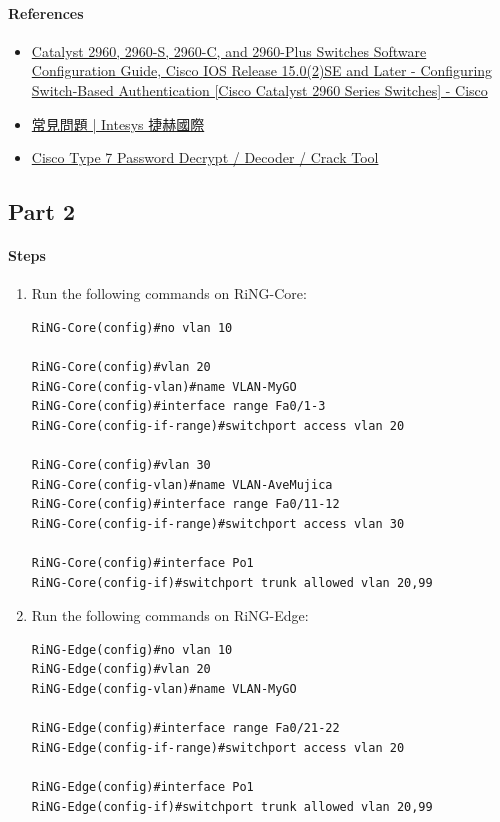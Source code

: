 \documentclass[12pt, a4paper]{article}
\begin{document}
  \paragraph{References}
  \begin{itemize}
    \item \href{https://www.cisco.com/c/en/us/td/docs/switches/lan/catalyst2960/software/release/15-0_2_se/configuration/guide/scg2960/swauthen.html}{Catalyst 2960, 2960-S, 2960-C, and 2960-Plus Switches Software Configuration Guide, Cisco IOS Release 15.0(2)SE and Later - Configuring Switch-Based Authentication [Cisco Catalyst 2960 Series Switches] - Cisco}
    \item \href{https://www.intesys.com.tw/edcontent_d.php?lang=tw&tb=10&cid=18&id=105}{常見問題 | Intesys 捷赫國際}
    \item \href{https://www.firewall.cx/cisco/cisco-routers/cisco-type7-password-crack.html}{Cisco Type 7 Password Decrypt / Decoder / Crack Tool}
  \end{itemize}

  \subsection*{Part 2}
  \paragraph{Steps}
  \begin{enumerate}
    \item Run the following commands on RiNG-Core:
\begin{verbatim}
RiNG-Core(config)#no vlan 10

RiNG-Core(config)#vlan 20
RiNG-Core(config-vlan)#name VLAN-MyGO
RiNG-Core(config)#interface range Fa0/1-3
RiNG-Core(config-if-range)#switchport access vlan 20

RiNG-Core(config)#vlan 30
RiNG-Core(config-vlan)#name VLAN-AveMujica
RiNG-Core(config)#interface range Fa0/11-12
RiNG-Core(config-if-range)#switchport access vlan 30

RiNG-Core(config)#interface Po1
RiNG-Core(config-if)#switchport trunk allowed vlan 20,99
\end{verbatim}
    \item Run the following commands on RiNG-Edge:
\begin{verbatim}
RiNG-Edge(config)#no vlan 10
RiNG-Edge(config)#vlan 20
RiNG-Edge(config-vlan)#name VLAN-MyGO

RiNG-Edge(config)#interface range Fa0/21-22
RiNG-Edge(config-if-range)#switchport access vlan 20

RiNG-Edge(config)#interface Po1
RiNG-Edge(config-if)#switchport trunk allowed vlan 20,99
\end{verbatim}
  \end{enumerate}
\end{document}
